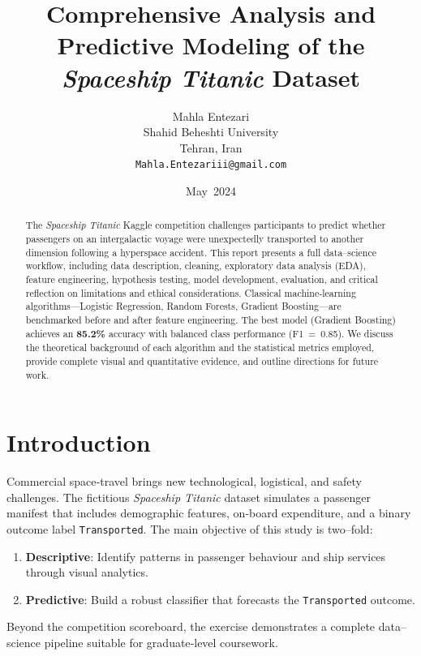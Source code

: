 \documentclass[12pt]{article}
\title{\textbf{Comprehensive Analysis and Predictive Modeling of the \emph{Spaceship Titanic} Dataset}}
\author{Mahla Entezari\\Shahid Beheshti University\\Tehran, Iran\\\texttt{Mahla.Entezariii@gmail.com}}
\date{May~2024}
\begin{document}
\maketitle

\begin{abstract}
The \emph{Spaceship Titanic} Kaggle competition challenges participants to predict whether passengers on an intergalactic voyage were unexpectedly transported to another dimension following a hyperspace accident.  This report presents a full data--science workflow, including data description, cleaning, exploratory data analysis (EDA), feature engineering, hypothesis testing, model development, evaluation, and critical reflection on limitations and ethical considerations.  Classical machine‑learning algorithms—Logistic Regression, Random Forests, Gradient Boosting—are benchmarked before and after feature engineering.  The best model (Gradient Boosting) achieves an \textbf{85.2\%} accuracy with balanced class performance (F1 = 0.85).  We discuss the theoretical background of each algorithm and the statistical metrics employed, provide complete visual and quantitative evidence, and outline directions for future work.
\end{abstract}


\section{Introduction}
Commercial space‑travel brings new technological, logistical, and safety challenges.  The fictitious \emph{Spaceship Titanic} dataset simulates a passenger manifest that includes demographic features, on‑board expenditure, and a binary outcome label \texttt{Transported}.  The main objective of this study is two–fold:
\begin{enumerate}
  \item \textbf{Descriptive}: Identify patterns in passenger behaviour and ship services through visual analytics.
  \item \textbf{Predictive}: Build a robust classifier that forecasts the \texttt{Transported} outcome.
\end{enumerate}
Beyond the competition scoreboard, the exercise demonstrates a complete data–science pipeline suitable for graduate‑level coursework.
\end{document}
